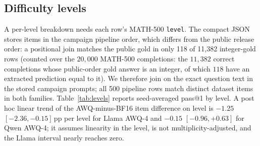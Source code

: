 \documentclass[11pt,a4paper]{article}
\begin{document}
\FloatBarrier
\subsection{Difficulty levels}
A per-level breakdown needs each row's MATH-500 \texttt{level}. The compact JSON stores items in the campaign pipeline order, which differs from the public release order: a positional join matches the public gold in only 118 of 11{,}382 integer-gold rows (counted over the $20{,}000$ MATH-500 completions: the $11{,}382$ correct completions whose public-order gold answer is an integer, of which $118$ have an extracted prediction equal to it). We therefore join on the exact question text in the stored campaign prompts; all 500 pipeline rows match distinct dataset items in both families.
Table~\ref{tab:levels} reports seed-averaged pass@1 by level. A post hoc linear trend of the AWQ-minus-BF16 item difference on level is $-1.25$ $[-2.36,-0.15]$\,pp per level for Llama AWQ-4 and $-0.15$ $[-0.96,+0.63]$ for Qwen AWQ-4; it assumes linearity in the level, is not multiplicity-adjusted, and the Llama interval nearly reaches zero.

\begin{table}[!htbp]
\centering
\caption{MATH-500 seed-averaged pass@1 (\%) by difficulty level, joined to the public dataset by exact question text. $n$: items per level. Last rows: Llama AWQ-4 minus BF16 paired difference (pp) with an item-level 95\% CI ($B=10{,}000$). Per-level intervals are exploratory.}
\label{tab:levels}
\small
{}
\end{table}
\end{document}
